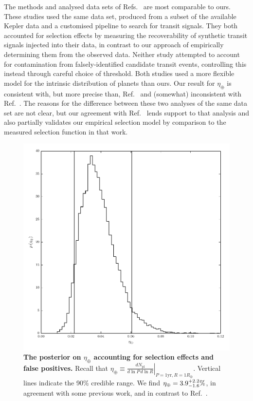 \documentclass{nature}
\newcommand{\etaearth}{\eta_\oplus}
\newcommand{\REarth}{R_\oplus}
\begin{document}
The methods and analysed data sets of
Refs.\ \cite{Petigura2013,Foreman-Mackey2014} are most comparable to
ours.  These studies used the same data set,
produced\cite{Petigura2013} from a subset of the available Kepler data
and a customised pipeline to search for transit signals.  They both
accounted for selection effects by measuring the recoverability of
synthetic transit signals injected into their data, in contrast to our
approach of empirically determining them from the observed data.
Neither study attempted to account for contamination from
falsely-identified candidate transit events, controlling this instead
through careful choice of threshold.  Both studies used a more
flexible model for the intrinsic distribution of planets than ours.
Our result for $\etaearth$ is consistent with, but more precise than,
Ref.\ \cite{Foreman-Mackey2014} and (somewhat) inconsistent with
Ref.\ \cite{Petigura2013}.  The reasons for the difference between
these two analyses of the same data set are not clear, but our
agreement with Ref.\ \cite{Foreman-Mackey2014} lends support to that
analysis and also partially validates our empirical selection model by
comparison to the measured selection function in that work.

\begin{figure}
  \includegraphics[width=\columnwidth]{eta-earth}
  \caption{\label{fig:eta-earth} \textbf{The posterior on $\etaearth$
      accounting for selection effects and false positives.}  Recall
    that $\etaearth \equiv \left. \frac{dN_\mathrm{pl}}{d\ln P \,d \ln
      R} \right|_{P = 1\mathrm{yr}, R=1\REarth}$.  Vertical lines
    indicate the 90\% credible range.  We find $\etaearth = \earange$,
    in agreement with some previous work\cite{Foreman-Mackey2014}, and
    in contrast to Ref.\ \cite{Petigura2013}.}
\end{figure}
\end{document}
